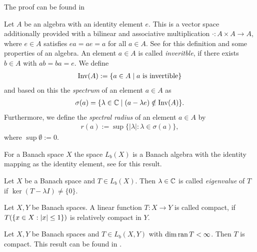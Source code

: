 The proof can be found in \cite[p. 50]{FAna1}


\begin{definition}
	Let $A$ be an algebra with an identity element $e$. This is a vector space additionally provided with a bilinear and associative multiplication $\cdot: A \times A \to A$, where $e \in A$ satisfies $ea = ae = a$ for all $a \in  A$. See \cite[p.121-122]{FAna1} for this definition and some properties of an algebra. An element $a \in A$ is called \textit{inveritble}, if there exists $b \in A$ with $ab = ba = e$. We define
	\begin{align*}
		\operatorname{Inv}(A) := \{a \in A \mid a \text{ is invertible}\}
	\end{align*}
	and based on this the \textit{spectrum} of an element $a \in A$ as
	\begin{align*}
		\sigma(a) = \{\lambda \in \mathbb{C} \mid (a - \lambda e) \notin \operatorname{Inv}(A)\}.
	\end{align*}
	Furthermore, we define the \textit{spectral radius} of an element $a \in A$ by
	\begin{align*}
		r(a) := \sup\{|\lambda| : \lambda \in \sigma(a)\},
	\end{align*}
	where $\sup \emptyset := 0$.
\end{definition}


\begin{remark}
	For a Banach space $X$ the space $L_b(X)$ is a Banach algebra with the identity mapping as the identity element, see \cite[p.121-122]{FAna1} for this result. 
\end{remark}


\begin{definition}
	Let $X$ be a Banach space and $T \in L_b(X)$. Then $\lambda \in \mathbb{C}$ is called \textit{eigenvalue} of $T$ if $\ker(T - \lambda I) \neq \{0\}$. 
\end{definition}


\begin{definition}
	Let $X, Y$ be Banach spaces. A linear function $T: X \to Y$ is called compact, if $T{\left ( {\left \{ x \in X: {\left | x \right |} \leq 1 \right \}} \right )}$ is relatively compact in $Y$. 
\end{definition}

\begin{remark} \label{remark:compact}
	Let $X, Y$ be Banach spaces and $T \in L_b(X,Y)$ with $\dim \operatorname{ran} T < \infty$. Then $T$ is compact. This result can be found in \cite[p. 133]{FAna1}.
\end{remark}

